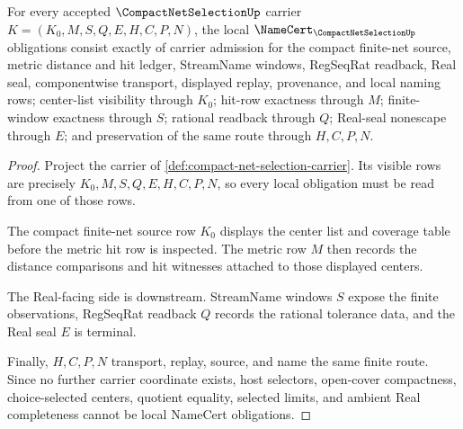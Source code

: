 \begin{theorem}
\label{thm:compact-net-selection-namecert-obligations}
For every accepted $\CompactNetSelectionUp$ carrier $K=(K_0,M,S,Q,E,H,C,P,N)$, the local $\NameCert_{\CompactNetSelectionUp}$ obligations consist exactly of carrier admission for the compact finite-net source, metric distance and hit ledger, StreamName windows, RegSeqRat readback, Real seal, componentwise transport, displayed replay, provenance, and local naming rows; center-list visibility through $K_0$; hit-row exactness through $M$; finite-window exactness through $S$; rational readback through $Q$; Real-seal nonescape through $E$; and preservation of the same route through $H,C,P,N$.
\end{theorem}
\begin{proof}
Project the carrier of \autoref{def:compact-net-selection-carrier}. Its visible rows are precisely $K_0,M,S,Q,E,H,C,P,N$, so every local obligation must be read from one of those rows.

The compact finite-net source row $K_0$ displays the center list and coverage table before the metric hit row is inspected. The metric row $M$ then records the distance comparisons and hit witnesses attached to those displayed centers.

The Real-facing side is downstream. StreamName windows $S$ expose the finite observations, RegSeqRat readback $Q$ records the rational tolerance data, and the Real seal $E$ is terminal.

Finally, $H,C,P,N$ transport, replay, source, and name the same finite route. Since no further carrier coordinate exists, host selectors, open-cover compactness, choice-selected centers, quotient equality, selected limits, and ambient Real completeness cannot be local NameCert obligations.
\end{proof}

